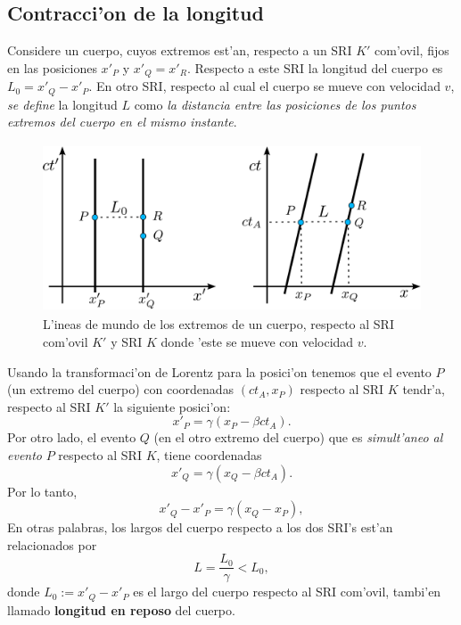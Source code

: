 \subsection{Contracci'on de la longitud}
Considere un cuerpo, cuyos extremos est'an, respecto a un SRI $K'$ com'ovil, fijos en las posiciones $x'_P$ y $x'_Q=x'_R$. Respecto a este SRI la longitud del cuerpo es $L_0=x'_Q-x'_P$. En otro SRI, respecto al cual el cuerpo se mueve con velocidad $v$, \textit{se define} la longitud $L$ como \textit{la distancia entre las posiciones de los puntos extremos del cuerpo en el mismo instante}.
\begin{figure}[!h]
\centerline{\includegraphics[height= 5cm]{fig/fig-diagrama-contraccion.pdf}}
 \caption{L'ineas de mundo de los extremos de un cuerpo, respecto al SRI com'ovil $K'$ y SRI $K$ donde 'este se mueve con velocidad $v$.}
\label{fcl}
\end{figure}

 Usando la transformaci'on de Lorentz para la posici'on tenemos que el evento $P$ (un extremo del cuerpo) con coordenadas $(ct_A,x_P)$ respecto al SRI $K$ tendr'a, respecto al SRI $K'$ la siguiente posici'on:
\begin{equation}
x'_P=\gamma(x_P-\beta c t_A).
\end{equation}
Por otro lado, el evento $Q$ (en el otro extremo del cuerpo) que es \textit{simult'aneo al evento} $P$ respecto al SRI $K$, tiene coordenadas
\begin{equation}
x'_Q=\gamma(x_Q-\beta c t_A).
\end{equation}
Por lo tanto,
\begin{equation}
x'_Q-x'_P=\gamma(x_Q-x_P),
\end{equation}
En otras palabras, los largos del cuerpo respecto a los dos SRI's est'an relacionados por
\begin{equation}
L=\frac{L_0}{\gamma}<L_0,
\end{equation}
donde $L_0:=x'_Q-x'_P$ es el largo del cuerpo respecto al SRI com'ovil, tambi'en llamado \textbf{longitud en reposo} del cuerpo.

